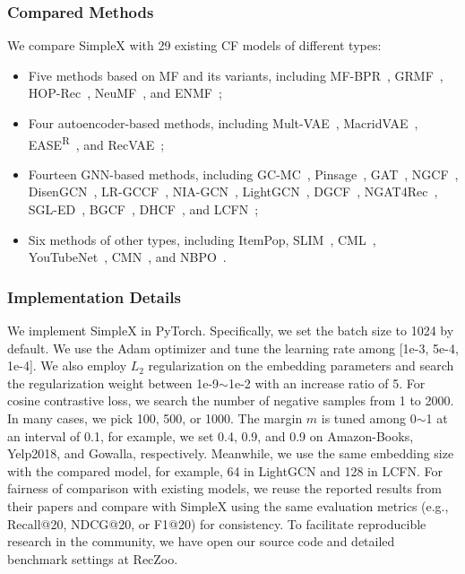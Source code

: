 \documentclass[sigconf,authorversion]{acmart}
\begin{document}
\subsubsection{Compared Methods}
We compare SimpleX with 29 existing CF models of different types:
\begin{itemize}
    \item  Five methods based on MF and its variants, including MF-BPR~\cite{MF}, GRMF~\cite{GRMF}, HOP-Rec~\cite{HOP-Rec}, NeuMF~\cite{NeuMF}, and ENMF~\cite{ENMF};
    \item Four autoencoder-based methods, including Mult-VAE~\cite{MVAE}, MacridVAE~\cite{MacridVAE}, EASE\textsuperscript{R}~\cite{EASE}, and RecVAE~\cite{RecVAE};
    \item Fourteen GNN-based methods, including GC-MC~\cite{GC-MC}, Pinsage~\citep{PinSage}, GAT~\cite{GAT}, NGCF~\cite{NGCF}, DisenGCN~\cite{DisenGCN}, LR-GCCF~\cite{LR-GCCF}, NIA-GCN~\cite{NIA-GCN}, LightGCN~\cite{LightGCN}, DGCF~\cite{DGCF}, NGAT4Rec~\cite{NGAT4Rec}, SGL-ED~\cite{SGL-ED}, BGCF~\cite{BGCF}, DHCF~\cite{DHCF}, and LCFN~\cite{LCFN};
    \item Six methods of other types, including ItemPop, SLIM~\cite{SLIM}, CML~\cite{CML}, YouTubeNet~\cite{YouTubeNet},  CMN~\cite{CMN}, and NBPO~\cite{NBPO}.
\end{itemize}





    
\subsubsection{Implementation Details}
\label{implementation}
We implement SimpleX in PyTorch. Specifically, we set the batch size to 1024 by default. We use the Adam optimizer and tune the learning rate among [1e-3, 5e-4, 1e-4]. We also employ $L_2$ regularization on the embedding parameters and search the regularization weight between 1e-9$\sim$1e-2 with an increase ratio of 5. For cosine contrastive loss, we search the number of negative samples from 1 to 2000. In many cases, we pick 100, 500, or 1000. The margin $m$ is tuned among 0$\sim$1 at an interval of 0.1, for example, we set 0.4, 0.9, and 0.9 on Amazon-Books, Yelp2018, and Gowalla, respectively. Meanwhile, we use the same embedding size with the compared model, for example, 64 in LightGCN and 128 in LCFN. For fairness of comparison with existing models, we reuse the reported results from their papers and compare with SimpleX using the same evaluation metrics (e.g., Recall@20, NDCG@20, or F1@20) for consistency. To facilitate reproducible research in the community, we have open our source code and detailed benchmark settings at RecZoo.
\end{document}

